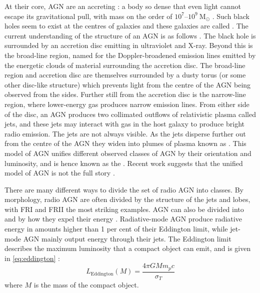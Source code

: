         At their core, AGN are an accreting : a body so dense that even light cannot escape its gravitational pull, with mass on the order of $10^7$--$10^9\ \mathrm{M}_\odot$ \citep{marconi_relation_2003}. Such black holes seem to exist at the centres of galaxies and these galaxies are called . The current understanding of the structure of an AGN is as follows \citep{urry_unified_1995}. The black hole is surrounded by an accretion disc emitting in ultraviolet and X-ray. Beyond this is the broad-line region, named for the Doppler-broadened emission lines emitted by the energetic clouds of material surrounding the accretion disc. The broad-line region and accretion disc are themselves surrounded by a dusty torus (or some other disc-like structure) which prevents light from the centre of the AGN being observed from the sides. Further still from the accretion disc is the narrow-line region, where lower-energy gas produces narrow emission lines. From either side of the disc, an AGN produces two collimated outflows of relativistic plasma called {jets}, and these jets may interact with gas in the host galaxy to produce bright radio emission. The jets are not always visible. As the jets disperse further out from the centre of the AGN they widen into plumes of plasma known as . This model of AGN unifies different observed classes of AGN by their orientation and luminosity, and is hence known as the  \citep{antonucci_unified_1993}. Recent work suggests that the unified model of AGN is not the full story \citep[e.g.][]{zhuang_interplay_2020}.

        There are many different ways to divide the set of radio AGN into classes. By morphology, radio AGN are often divided by the structure of the jets and lobes, with FRI and FRII the most striking examples. AGN can also be divided into  and  by how they expel their energy \citep{heckman_coevolution_2014}. Radiative-mode AGN produce radiative energy in amounts higher than 1 per cent of their Eddington limit, while jet-mode AGN mainly output energy through their jets. The Eddington limit describes the maximum luminosity that a compact object can emit, and is given in \autoref{eq:eddington} \citep{rybicki_radiative_1979}:
        \begin{equation}
            L_{\mathrm{Eddington}}(M) = \frac{4\pi G M m_p c}{\sigma_T}
            \label{eq:eddington}
        \end{equation}
        where $M$ is the mass of the compact object.

